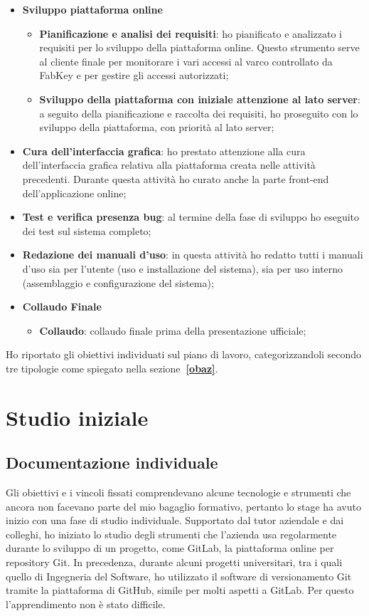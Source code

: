 \begin{itemize}
\item \textbf{Sviluppo piattaforma online}
\begin{itemize}
	\item \textbf{Pianificazione e analisi dei requisiti}: ho pianificato e analizzato i requisiti per lo sviluppo della piattaforma online. Questo strumento serve al cliente finale per monitorare i vari accessi al varco controllato da FabKey e per gestire gli accessi autorizzati;
	\item \textbf{Sviluppo della piattaforma con iniziale attenzione al lato server}: a seguito della pianificazione e raccolta dei requisiti, ho proseguito con lo sviluppo della piattaforma, con priorità al lato server;
\end{itemize}

\item \textbf{Cura dell'interfaccia grafica}: ho prestato attenzione alla cura dell'interfaccia grafica relativa alla piattaforma creata nelle attività precedenti. Durante questa attività ho curato anche la parte front-end dell'applicazione online;
\item \textbf{Test e verifica presenza bug}: al termine della fase di sviluppo ho eseguito dei test sul sistema completo;
\item \textbf{Redazione dei manuali d’uso}: in questa attività ho redatto tutti i manuali d'uso sia per l'utente (uso e installazione del sistema), sia per uso interno (assemblaggio e configurazione del sistema);

\item \textbf{Collaudo Finale}
\begin{itemize}
	\item \textbf{Collaudo}: collaudo finale prima della presentazione ufficiale;
\end{itemize}
\end{itemize}

\medskip

Ho riportato gli obiettivi individuati sul piano di lavoro, categorizzandoli secondo tre tipologie come spiegato nella sezione\textbf{~\ref{obaz}}.


\section{Studio iniziale}
\subsection{Documentazione individuale}
Gli obiettivi e i vincoli fissati comprendevano alcune tecnologie e strumenti che ancora non facevano parte del mio bagaglio formativo, pertanto lo stage ha avuto inizio con una fase di studio individuale.
Supportato dal tutor aziendale e dai colleghi, ho iniziato lo studio degli strumenti che l'azienda usa regolarmente durante lo sviluppo di un progetto, come GitLab, la piattaforma online per repository Git. In precedenza, durante alcuni progetti universitari, tra i quali quello di Ingegneria del Software, ho utilizzato il software di versionamento Git tramite la piattaforma di GitHub, simile per molti aspetti a GitLab. Per questo l'apprendimento non è stato difficile.

